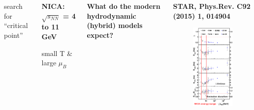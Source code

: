 \documentclass[dvipsnames] {beamer}
\begin{document}
\begin{frame}
\begin{columns}
\begin{block}{}
{\begin{center}
        \alert{search for ``critical point''}
         \end{center}
      }
    \end{block}
    \begin{block}{}
      \footnotesize{
        \begin{center}
          \bf
          NICA: $\sqrt{s_{NN}}$ = 4 to 11 GeV

           \vspace{0.15cm}
        
           \alert {small T \& large $\mu_{B}$}

        \end{center} 
      }
    \end{block}
    \begin{block}{}
      {\centering \footnotesize \bf \alert {What do the modern  hydrodynamic (hybrid) models expect?}}
    \end{block}   
    \begin{block}{\center \tiny \bf STAR, Phys.Rev. C92 (2015) 1, 014904}
      \begin{figure}[H]
        \includegraphics[width=.65\linewidth]{RiRootS.png}

\end{figure}
\end{block}
\end{columns}
\end{frame}
\end{document}
